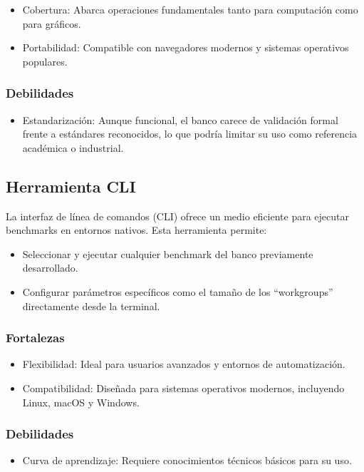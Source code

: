 \documentclass[conference]{IEEEtran}
\begin{document}
\begin{itemize}
	\item Cobertura: Abarca operaciones fundamentales tanto para computación como
    para gráficos.
	\item Portabilidad: Compatible con navegadores modernos y sistemas operativos
    populares.
\end{itemize}

\subsubsection{Debilidades}
\begin{itemize}
  \item Estandarización: Aunque funcional, el banco carece de validación formal
    frente a estándares reconocidos, lo que podría limitar su uso como
    referencia académica o industrial.
\end{itemize}

\subsection{Herramienta CLI}

La interfaz de línea de comandos (CLI) ofrece un medio eficiente para ejecutar benchmarks en entornos nativos. Esta herramienta permite:
\begin{itemize}
	\item Seleccionar y ejecutar cualquier benchmark del banco previamente desarrollado.
	\item Configurar parámetros específicos como el tamaño de los “workgroups” directamente desde la terminal.
\end{itemize}

\subsubsection{Fortalezas}
\begin{itemize}
	\item Flexibilidad: Ideal para usuarios avanzados y entornos de automatización.
	\item Compatibilidad: Diseñada para sistemas operativos modernos, incluyendo Linux, macOS y Windows.
\end{itemize}

\subsubsection{Debilidades}
\begin{itemize}
	\item Curva de aprendizaje: Requiere conocimientos técnicos básicos para su uso.
\end{itemize}
\end{document}
